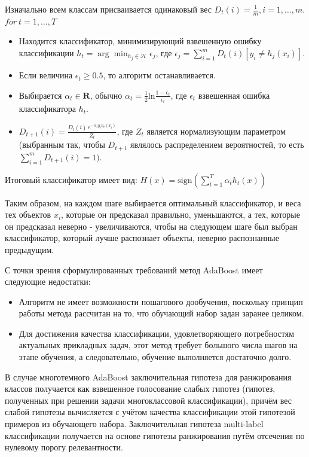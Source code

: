 \documentclass[russian, utf8, emptystyle]{eskdtext}
\begin{document}
Изначально всем классам присваивается одинаковый вес $D_{t}(i) = \frac{1}{m}, i=1,\ldots,m.$
$for~t = 1, \ldots, T$
\begin{itemize}
	\item Находится классификатор, минимизирующий взвешенную ошибку классификации $ h_{t} = \arg \min_{h_{j} \in \mathcal{H}} \epsilon_{j}$, где  $\epsilon_{j} = \sum_{i=1}^{m} D_{t}(i)[y_i \ne h_{j}(x_{i})]$.
	\item Если величина $\epsilon_{t} \geqslant 0.5$, то алгоритм останавливается.
	\item Выбирается $\alpha_{t} \in \mathbf{R}$, обычно $\alpha_{t}=\frac{1}{2}\textrm{ln}\frac{1-\epsilon_{t}}{\epsilon_{t}}$, где $\epsilon_{t}$ взвешенная ошибка классификатора $h_{t}$.
	\item $D_{t+1}(i) = \frac{ D_{t}(i) \, e^{- \alpha_{t} y_{i} h_{t}(x_{i})} }{ Z_{t} }$, где $Z_{t}$ является нормализующим параметром (выбранным так, чтобы $D_{t+1}$ являлось распределением вероятностей, то есть $\sum_{i=1}^{m} D_{t+1}(i) = 1)$.
\end{itemize}

Итоговый классификатор имеет вид: $H(x) = \textrm{sign}\left( \sum_{t=1}^{T} \alpha_{t}h_{t}(x)\right)$

Таким образом, на каждом шаге выбирается оптимальный классификатор, и веса тех объектов $x_i$, которые он предсказал правильно, уменьшаются, а тех, которые он предсказал неверно - увеличиваются, чтобы на следующем шаге был выбран классификатор, который лучше распознает объекты, неверно распознанные предыдущим.

С точки зрения сформулированных требований метод AdaBoost имеет следующие недостатки:
\begin{itemize}
	\item Алгоритм не имеет возможности пошагового дообучения, поскольку принцип работы метода рассчитан на то, что обучающий набор задан заранее целиком.
	\item Для достижения качества классификации, удовлетворяющего потребностям актуальных прикладных задач, этот метод требует большого числа шагов на этапе обучения, а следовательно, обучение выполняется достаточно долго.
\end{itemize}

В случае многотемного AdaBoost заключительная гипотеза для ранжирования классов получается как взвешенное голосование слабых гипотез (гипотез, полученных при решении задачи многоклассовой классификации), причём вес слабой гипотезы вычисляется с учётом качества классификации этой гипотезой примеров из обучающего набора. Заключительная гипотеза multi-label классификации получается на основе гипотезы ранжирования путём отсечения по нулевому порогу релевантности.
\end{document}

